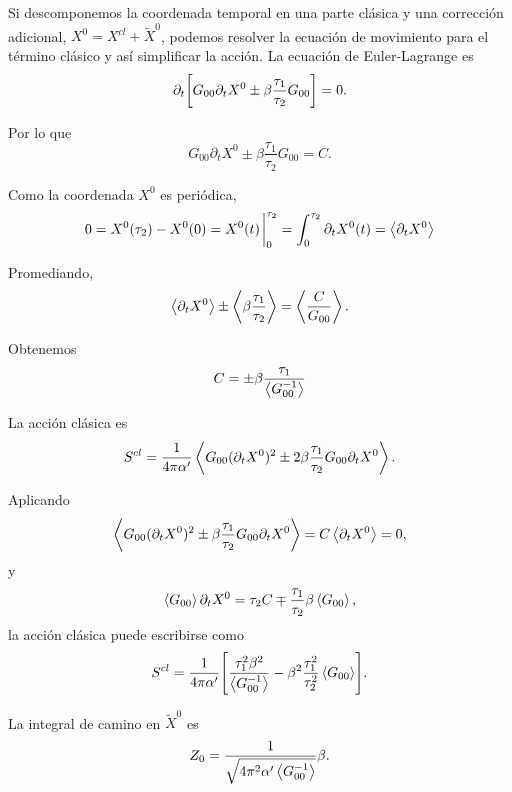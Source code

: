 Si descomponemos la coordenada temporal en una parte clásica y una corrección adicional,
$X^0=X^{cl}+\tilde X^0$, podemos resolver la ecuación de movimiento para el término clásico y
así simplificar la acción.
La ecuación de Euler-Lagrange es 
\begin{equation}
  \partial_t\qty[G_{00}\partial_t X^0 \pm \beta \frac{\tau_1}{\tau_2}G_{00}]=0.
\end{equation}

Por lo que 
\begin{equation}
  G_{00}\partial_t X^0 \pm \beta \frac{\tau_1}{\tau_2}G_{00}=C.
\end{equation}

Como la coordenada $X^0$ es periódica,
\begin{equation}
  0=X^0(\tau_2) -X^0(0) = X^0(t)\eval_0^{\tau_2}= \int_0^{\tau_2}\partial_t X^0(t) = \ev{\partial_t X^0}
\end{equation}

Promediando,
\begin{equation}
  \ev{\partial_t X^0} \pm \ev{\beta \frac{\tau_1}{\tau_2}}=\ev{\frac{C}{G_{00}}} .
\end{equation}

Obtenemos
\begin{equation}
  C = \pm \beta \frac{\tau_1}{\ev{G_{00}^{-1}}}
\end{equation}

La acción clásica es
\begin{equation}
  S^{cl}=\frac{1}{4\pi\alpha'}\ev{G_{00}(\partial_t X^0)^2 \pm 2\beta \frac{\tau_1}{\tau_2}G_{00}\partial_t X^0}.
\end{equation}

Aplicando 
\begin{equation}
  \ev{G_{00}(\partial_t X^0)^2 \pm \beta \frac{\tau_1}{\tau_2}G_{00}\partial_t X^0} = C\ev{\partial_t X^0} = 0,
\end{equation}
y
\begin{equation}
  \ev{G_{00}}\partial_t X^0 = \tau_2 C\mp \frac{\tau_1}{\tau_2}\beta \ev{G_{00}},
\end{equation}
la acción clásica puede escribirse como
\begin{equation}
  S^{cl}= \frac{1}{4\pi\alpha'} \qty[\frac{\tau_1^2\beta^2}{\ev{G_{00}^{-1}}}-\beta^2\frac{\tau_1^2}{\tau_2^2}\ev{G_{00}}].
\end{equation}

La integral de camino en $\tilde X^0$ es
\begin{equation}
  Z_0=\frac{1}{\sqrt{4\pi^2\alpha'\ev{G_{00}^{-1}}}}\beta.
\end{equation}

